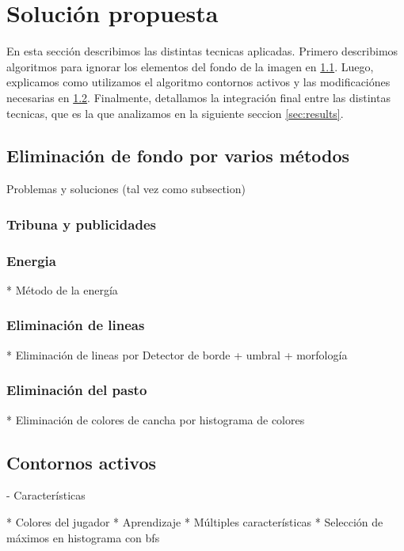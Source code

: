 \chapter{Solución propuesta}
\label{sec:solution}

En esta sección describimos las distintas tecnicas aplicadas. Primero describimos algoritmos para
ignorar los elementos del fondo de la imagen en \ref{sec:background-elimination}. Luego, explicamos
como utilizamos el algoritmo contornos activos\cite{fast-level-set} y las modificaciónes necesarias
en \ref{sec:ac-extension}. Finalmente, detallamos la integración final entre las distintas tecnicas, que es
la que analizamos en la siguiente seccion \ref{sec:results}.

\section{Eliminación de fondo por varios métodos}
\label{sec:background-elimination}
Problemas y soluciones (tal vez como subsection)

\subsection{Tribuna y publicidades}

\subsection{Energia}
  * Método de la energía

\subsection{Eliminación de lineas}
  * Eliminación de lineas por Detector de borde + umbral + morfología

\subsection{Eliminación del pasto}
  * Eliminación de colores de cancha por histograma de colores


\section{Contornos activos}
\label{sec:ac-extension}

- Características

  * Colores del jugador
  * Aprendizaje
  * Múltiples características
  * Selección de máximos en histograma con bfs

